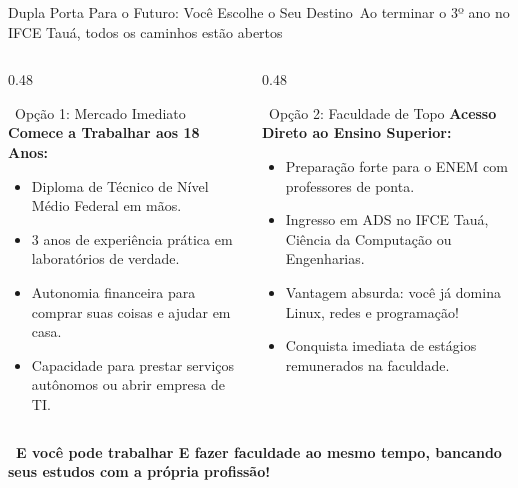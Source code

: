 \begin{frame}{Dupla Porta Para o Futuro: Você Escolhe o Seu Destino}{\faDirections\ Ao terminar o 3º ano no IFCE Tauá, todos os caminhos estão abertos}
  \begin{columns}[t]
    \begin{column}{0.48\textwidth}
      \begin{greencard}{\faDollarSign\ Opção 1: Mercado Imediato}
        \tiny
        \textbf{Comece a Trabalhar aos 18 Anos:}
        \begin{itemize}\setlength{\itemsep}{0.18em}
          \item Diploma de Técnico de Nível Médio Federal em mãos.
          \item 3 anos de experiência prática em laboratórios de verdade.
          \item Autonomia financeira para comprar suas coisas e ajudar em casa.
          \item Capacidade para prestar serviços autônomos ou abrir empresa de TI.
        \end{itemize}
      \end{greencard}
    \end{column}
    
    \begin{column}{0.48\textwidth}
      \begin{purplecard}{\faUniversity\ Opção 2: Faculdade de Topo}
        \tiny
        \textbf{Acesso Direto ao Ensino Superior:}
        \begin{itemize}\setlength{\itemsep}{0.18em}
          \item Preparação forte para o ENEM com professores de ponta.
          \item Ingresso em ADS no IFCE Tauá, Ciência da Computação ou Engenharias.
          \item Vantagem absurda: você já domina Linux, redes e programação!
          \item Conquista imediata de estágios remunerados na faculdade.
        \end{itemize}
      \end{purplecard}
    \end{column}
  \end{columns}
  
  \vspace{0.08cm}
  \begin{center}
    \scriptsize \textcolor{IFCERed}{\textbf{\faStar\ E você pode trabalhar E fazer faculdade ao mesmo tempo, bancando seus estudos com a própria profissão!}}
  \end{center}
\end{frame}
